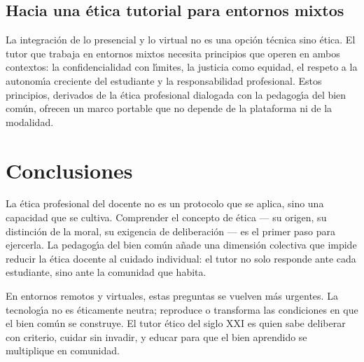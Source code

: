 \documentclass[12pt,letterpaper]{article}
\begin{document}
\subsection{Hacia una \'etica tutorial para entornos mixtos}

La integraci\'on de lo presencial y lo virtual no es una opci\'on t\'ecnica sino \'etica. El tutor que trabaja en entornos mixtos necesita principios que operen en ambos contextos: la confidencialidad con l\'{\i}mites, la justicia como equidad, el respeto a la autonom\'{\i}a creciente del estudiante y la responsabilidad profesional. Estos principios, derivados de la \'etica profesional dialogada con la pedagog\'{\i}a del bien com\'un, ofrecen un marco portable que no depende de la plataforma ni de la modalidad.

\section{Conclusiones}

La \'etica profesional del docente no es un protocolo que se aplica, sino una capacidad que se cultiva. Comprender el concepto de \'etica --- su origen, su distinci\'on de la moral, su exigencia de deliberaci\'on --- es el primer paso para ejercerla. La pedagog\'{\i}a del bien com\'un a\~nade una dimensi\'on colectiva que impide reducir la \'etica docente al cuidado individual: el tutor no solo responde ante cada estudiante, sino ante la comunidad que habita.

En entornos remotos y virtuales, estas preguntas se vuelven m\'as urgentes. La tecnolog\'{\i}a no es \'eticamente neutra; reproduce o transforma las condiciones en que el bien com\'un se construye. El tutor \'etico del siglo XXI es quien sabe deliberar con criterio, cuidar sin invadir, y educar para que el bien aprendido se multiplique en comunidad.
\end{document}
